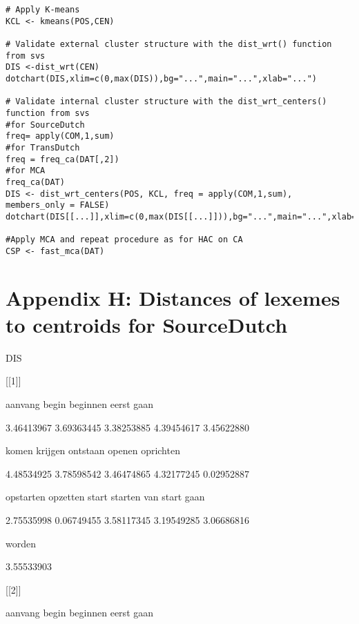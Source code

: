 \begin{lstlisting}[style=RStyle]
# Apply K-means
KCL <- kmeans(POS,CEN)

# Validate external cluster structure with the dist_wrt() function from svs
DIS <-dist_wrt(CEN)
dotchart(DIS,xlim=c(0,max(DIS)),bg="...",main="...",xlab="...")

# Validate internal cluster structure with the dist_wrt_centers() function from svs
#for SourceDutch
freq= apply(COM,1,sum)
#for TransDutch
freq = freq_ca(DAT[,2])
#for MCA
freq_ca(DAT)
DIS <- dist_wrt_centers(POS, KCL, freq = apply(COM,1,sum), members_only = FALSE)
dotchart(DIS[[...]],xlim=c(0,max(DIS[[...]])),bg="...",main="...",xlab="...")

#Apply MCA and repeat procedure as for HAC on CA
CSP <- fast_mca(DAT)
\end{lstlisting}

\section{Appendix H: Distances of lexemes to centroids for SourceDutch}

DIS



[[1]]



       aanvang          begin       beginnen          eerst           gaan 



    3.46413967     3.69363445     3.38253885     4.39454617     3.45622880 



         komen        krijgen       ontstaan         openen      oprichten 



    4.48534925     3.78598542     3.46474865     4.32177245     0.02952887 



     opstarten       opzetten          start        starten van start gaan 



    2.75535998     0.06749455     3.58117345     3.19549285     3.06686816 



        worden 



    3.55533903 



[[2]]



       aanvang          begin       beginnen          eerst           gaan 



